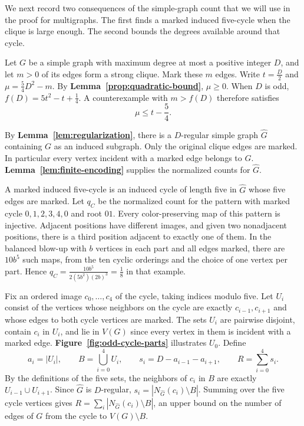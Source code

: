 We next record two consequences of the simple-graph count that we will
use in the proof for multigraphs. The first finds a marked induced
five-cycle when the clique is large enough. The second bounds the
degrees available around that cycle.

Let $G$ be a simple graph with maximum degree at most a positive
integer $D$, and let $m>0$ of its edges form a strong clique.
Mark these $m$ edges. Write $t=\frac{D}{2}$ and
$\mu=\frac{5}{4} D^2-m$. By \textbf{Lemma~\ref{prop:quadratic-bound}},
$\mu\geq0$. When $D$ is odd, $f(D)=5t^2-t+\frac{1}{4}$. A counterexample
with $m>f(D)$ therefore satisfies
\begin{equation}\label{eq:odd-counterexample}
 \mu\leq t-\frac{5}{4}.
\end{equation}

By \textbf{Lemma~\ref{lem:regularization}}, there is a $D$-regular
simple graph $\widehat G$ containing $G$ as an induced subgraph.
Only the original clique edges are marked. In particular every vertex
incident with a marked edge belongs to $G$.
\textbf{Lemma~\ref{lem:finite-encoding}} supplies the normalized
counts for $\widehat G$.

A marked induced five-cycle is an induced cycle of length five in
$\widehat G$ whose five edges are marked. Let $q_C$ be the normalized
count for the pattern with marked cycle $0,1,2,3,4,0$ and root $01$.
Every color-preserving map of this pattern is injective. Adjacent
positions have different images, and given two nonadjacent positions,
there is a third position adjacent to exactly one of them.
In the balanced blow-up with $b$ vertices in each part and all
edges marked, there are $10b^5$ such maps, from the ten cyclic
orderings and the choice of one vertex per part. Hence
$q_C=\frac{10b^5}{2(5b^2)(2b)^3}=\frac{1}{8}$ in that example.

Fix an ordered image $c_0,\ldots,c_4$ of the cycle, taking indices
modulo five. Let $U_i$ consist of the vertices whose neighbors on
the cycle are exactly $c_{i-1},c_{i+1}$ and whose edges to both
cycle vertices are marked. The sets $U_i$ are pairwise disjoint,
contain $c_i$ in $U_i$, and lie in $V(G)$ since every vertex in
them is incident with a marked edge.
\textbf{Figure~\ref{fig:odd-cycle-parts}} illustrates $U_0$. Define
\begin{equation}\label{eq:odd-core-defs}
 a_i=|U_i|,\qquad B=\bigcup_{i=0}^4 U_i,\qquad
 s_i=D-a_{i-1}-a_{i+1},\qquad R=\sum_{i=0}^4 s_i.
\end{equation}
By the definitions of the five sets, the neighbors of $c_i$ in $B$
are exactly $U_{i-1}\cup U_{i+1}$. Since $\widehat G$ is $D$-regular,
$s_i=|N_{\widehat G}(c_i)\setminus B|$. Summing over the five cycle
vertices gives $R=\sum_i|N_{\widehat G}(c_i)\setminus B|$, an upper
bound on the number of edges of $G$ from the cycle to $V(G)\setminus B$.

